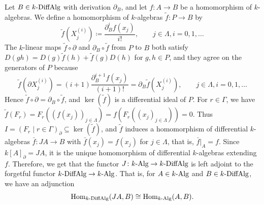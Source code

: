 \documentclass[a4paper, 12pt, reqno]{amsart}
\theoremstyle{remark}
\begin{document}
Let $B \in k\textnormal{-DiffAlg}$ with derivation $\partial_B$, and let $f \colon A \to B$ be a homomorphism of $k$-algebras.
We define a homomorphism of $k$-algebras $\tilde{f} \colon P \to B$ by
\begin{equation*}
  \tilde{f}(X_j^{(i)}) \coloneq \frac{\partial_B^if(x_j)}{i!}, \qquad j \in \Lambda, i = 0, 1, \dots
\end{equation*}
The $k$-linear maps $\tilde{f} \circ \partial$ and $\partial_B \circ \tilde{f}$ from $P$ to $B$ both satisfy $D(gh) = D(g)\tilde{f}(h) + \tilde{f}(g)D(h)$ for $g, h \in P$, and they agree on the generators of $P$ because
\begin{equation*}
  \tilde{f}(\partial X_j^{(i)}) = (i + 1)\frac{\partial_B^{i + 1}f(x_j)}{(i + 1)!} = \partial_B\tilde{f}(X_j^{(i)}), \qquad j \in \Lambda, i = 0, 1, \dots
\end{equation*}
Hence $\tilde{f} \circ \partial = \partial_B \circ \tilde{f}$, and $\ker(\tilde{f})$ is a differential ideal of $P$.
For $r \in \Gamma$, we have $\tilde{f}(F_r) = F_r((f(x_j))_{j \in \Lambda}) = f(F_r((x_j)_{j \in \Lambda})) = 0$.
Thus $I = (F_r \mid r \in \Gamma)_\partial \subseteq \ker(\tilde{f})$, and $\tilde{f}$ induces a homomorphism of differential $k$-algebras $\bar{f} \colon J A \to B$ with $\bar{f}(x_j) = f(x_j)$ for $j \in \Lambda$, that is, $\bar{f}|_A = f$.
Since $k[A]_\partial = J A$, it is the unique homomorphism of differential $k$-algebras extending $f$.
Therefore, we get that the functor $J \colon k\textnormal{-Alg} \to k\textnormal{-DiffAlg}$ is left adjoint to the forgetful functor $k\textnormal{-DiffAlg} \to k\textnormal{-Alg}$.
That is, for $A \in k\textnormal{-Alg}$ and $B \in k\textnormal{-DiffAlg}$, we have an adjunction
\begin{equation}
  \label{eq:jet-diff-adjunction}
  \operatorname{Hom}_{k\textnormal{-DiffAlg}}(J A, B) \cong \operatorname{Hom}_{k\textnormal{-Alg}}(A, B).
\end{equation}
\end{document}
